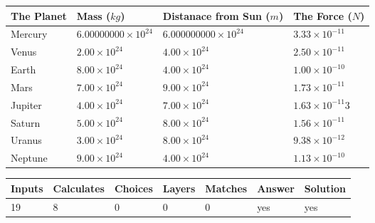 \documentclass[12pt]{article}
\begin{document}
\vspace{0.2in}
 
 
\begin{tabular}{|l|l|l|l|}
\hline
The Planet & Mass ($kg$) & Distanace from Sun ($m$) & The Force ($N$)\\
\hline
Mercury  &
           $ %
6.00000000 \times 10^{24}  $   &
             $ %
6.000000000 \times 10^{24}$    & $ %
3.33 \times 10^{-11} $
\\  \hline
Venus    &
           $  %
2.00 \times 10^{24}  $     &
             $ %
4.00 \times 10^{24} $    & $ %
2.50 \times 10^{-11} $
\\  \hline
Earth    &
           $  %
8.00 \times 10^{24}$     &
             $ %
4.00 \times 10^{24} $    & $ %
1.00 \times 10^{-10} $
\\   \hline
Mars     &
           $  %
7.00 \times 10^{24} $     &
             $ %
9.00 \times 10^{24}$    & $ %
1.73 \times 10^{-11} $
\\   \hline
Jupiter  &
           $  %
4.00 \times 10^{24}  $    &
             $ %
7.00 \times 10^{24} $    & $ %
1.63 \times 10^{-11}3 $
\\  \hline
Saturn   &
           $  %
5.00 \times 10^{24}   $    &
             $ %
8.00 \times 10^{24}  $    & $ %
1.56 \times 10^{-11} $
\\  \hline
Uranus   &
           $  %
3.00 \times 10^{24} $    &
             $ %
8.00 \times 10^{24}$    & $ %
9.38 \times 10^{-12} $
\\  \hline
Neptune  &
           $  %
9.00 \times 10^{24}  $    &
             $ %
4.00 \times 10^{24} $    & $ %
1.13 \times 10^{-10} $
\\  \hline
 
\end{tabular}
 
 
 
 
\noindent{}
 
 

 
\vspace{0.3in}
   
   
   
   
\noindent\begin{tabular}{|l|l|l|l|l|l|l|}
 \hline
Inputs & Calculates & Choices & Layers & Matches & Answer & Solution \\ \hline
          19 & 
           8 & 
           0
  & 
           0 & 
           0 & 
  yes & 
  yes 
  \\ \hline
 \end{tabular}
   
\end{document}

